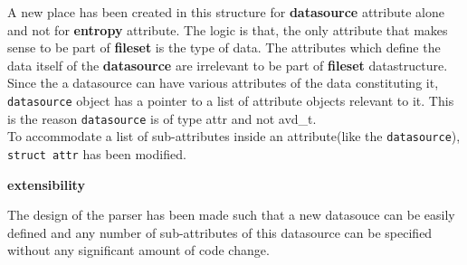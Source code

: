 \noindent A new place has been created in this structure for \textbf{datasource} attribute alone and not for \textbf{entropy} attribute. The logic is that, the only attribute that makes sense to be part of \textbf{fileset} is the type of data. The attributes which define the data itself of the \textbf{datasource} are irrelevant to be part of \textbf{fileset} datastructure.\\
\noindent Since the a datasource can have various attributes of the data constituting it, \verb+datasource+ object has a pointer to a list of attribute objects relevant to it. This is the reason \verb+datasource+ is of type attr and not avd\_t. \\
\noindent To accommodate  a list of sub-attributes inside an attribute(like the \verb+datasource+), \verb+struct attr+ has been modified.




\textbf{extensibility}

The design of the parser has been made such that a new datasouce can be easily defined and any number of sub-attributes of this datasource can be specified without any significant amount of code change.


\noindent

